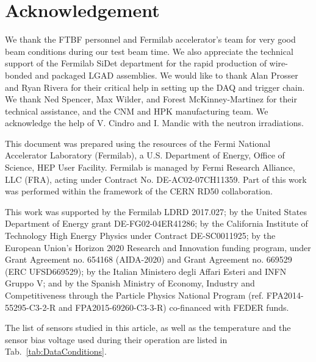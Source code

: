 \documentclass[preprint,1p]{elsarticle}
\begin{document}
\section*{Acknowledgement}

We thank the FTBF personnel and Fermilab accelerator's team for very good beam
conditions during our test beam time. We also appreciate the technical support
of the Fermilab SiDet department for the rapid production of wire-bonded and
packaged LGAD assemblies. We would like to thank Alan Prosser and Ryan Rivera
for their critical help in setting up the DAQ and trigger chain. We thank Ned
Spencer, Max Wilder, and Forest McKinney-Martinez for their technical
assistance, and the CNM and HPK manufacturing team. We acknowledge the help of
V. Cindro and I. Mandic with the neutron irradiations. 

This document was prepared using the resources of the Fermi National Accelerator
Laboratory (Fermilab), a U.S. Department of Energy, Office of Science, HEP User
Facility. Fermilab is managed by Fermi Research Alliance, LLC (FRA), acting
under Contract No. DE-AC02-07CH11359. Part of this work was performed within the
framework of the CERN RD50 collaboration.

This work was supported by the Fermilab LDRD 2017.027; by the United States
Department of Energy grant DE-FG02-04ER41286; by the California Institute of
Technology High Energy Physics under Contract DE-SC0011925; by the European
Union's Horizon 2020 Research and Innovation funding program, under Grant
Agreement no. 654168 (AIDA-2020) and Grant Agreement no. 669529 (ERC
UFSD669529); by the Italian Ministero degli Affari Esteri and INFN Gruppo V; and
by the Spanish Ministry of Economy, Industry and Competitiveness through the
Particle Physics National Program (ref. FPA2014-55295-C3-2-R and
FPA2015-69260-C3-3-R) co-financed with FEDER funds.



%

The list of sensors studied in this article, as well as the temperature and the
sensor bias voltage used during their operation are listed in
Tab.~\ref{tab:DataConditions}. 
\end{document}
